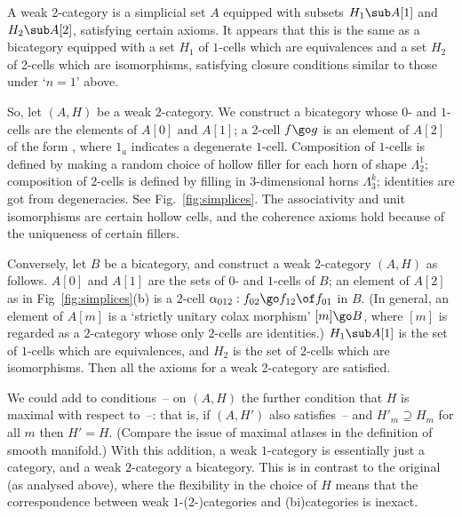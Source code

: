 A weak $2$-category is a simplicial set $A$ equipped with subsets $H_1\sub
A[1]$ and $H_2 \sub A[2]$, satisfying certain axioms.  It appears that this
is the same as a bicategory equipped with a set $H_1$ of $1$-cells which are
equivalences and a set $H_2$ of 2-cells which are isomorphisms, satisfying
closure conditions similar to those under `$n=1$' above.

So, let $(A,H)$ be a weak $2$-category.  We construct a bicategory whose $0$-
and $1$-cells are the elements of $A[0]$ and $A[1]$; a 2-cell $f\go g$ is an
element of $A[2]$ of the form
%
,
%
where $1_a$ indicates a degenerate $1$-cell.  Composition of $1$-cells is
defined by making a random choice of hollow filler for each horn of shape
$\Lambda^1_2$; composition of $2$-cells is defined by filling in
$3$-dimensional horns $\Lambda^k_3$; identities are got from degeneracies.
See Fig.~\ref{fig:simplices}.  The associativity and unit isomorphisms are
certain hollow cells, and the coherence axioms hold because of the uniqueness
of certain fillers.

Conversely, let $B$ be a bicategory, and construct a weak $2$-category
$(A,H)$ as follows.  $A[0]$ and $A[1]$ are the sets of $0$- and $1$-cells of
$B$; an element of $A[2]$ as in Fig~\ref{fig:simplices}(b) is a $2$-cell
$\alpha_{012}: f_{02} \go f_{12}\of f_{01}$ in $B$.  (In general, an element
of $A[m]$ is a `strictly unitary colax morphism' $[m] \go B$, where $[m]$ is
regarded as a $2$-category whose only $2$-cells are identities.)  $H_1 \sub
A[1]$ is the set of $1$-cells which are equivalences, and $H_2$ is the set of
$2$-cells which are isomorphisms.  Then all the axioms for a weak 2-category
are satisfied.




We could add to conditions~-- on $(A,H)$ the
further condition that $H$ is maximal with respect
to~--: that is, if $(A,H')$ also
satisfies~-- and $H'_m \supseteq H_m$ for
all $m$ then $H'=H$.  (Compare the issue of maximal atlases in the definition
of smooth manifold.)  With this addition, a weak $1$-category is essentially
just a category, and a weak $2$-category a bicategory.  This is in contrast
to the original  (as analysed above), where the flexibility in the
choice of $H$ means that the correspondence between weak $1$-($2$-)categories
and (bi)categories is inexact.



\clearpage







